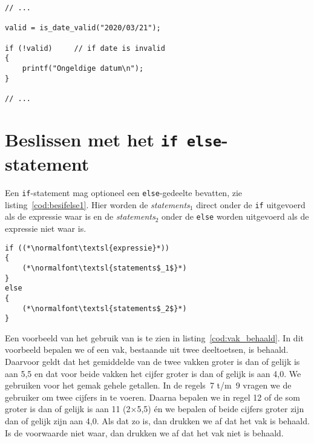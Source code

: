 \begin{lstlisting}[caption=Gebruik van de negatie-operator.,label=cod:besif2]
// ...

valid = is_date_valid("2020/03/21");

if (!valid)     // if date is invalid
{
    printf("Ongeldige datum\n");
}

// ...
\end{lstlisting}


\section{Beslissen met het \texttt{if else}-statement}
Een \texttt{if}-statement mag optioneel een \texttt{else}-gedeelte bevatten, zie listing~\ref{cod:besifelse1}. Hier worden de \textsl{statements}$_1$ direct onder de \texttt{if} uitgevoerd als de expressie waar is en de \textsl{statements}$_2$ onder de \texttt{else} worden uitgevoerd als de expressie niet waar is.

\begin{lstlisting}[caption=Algemene opzet van het \texttt{if else}-statement.,label=cod:besifelse1]
if ((*\normalfont\textsl{expressie}*))
{
    (*\normalfont\textsl{statements$_1$}*)
}
else
{
    (*\normalfont\textsl{statements$_2$}*)
}
\end{lstlisting}



Een voorbeeld van het gebruik van  is te zien in listing~\ref{cod:vak_behaald}. In dit voorbeeld bepalen we of een vak, bestaande uit twee deeltoetsen, is behaald. Daarvoor geldt dat het gemiddelde van de twee vakken groter is dan of gelijk is aan 5,5 en dat voor beide vakken het cijfer groter is dan of gelijk is aan 4,0. We gebruiken voor het gemak gehele getallen. In de regels~7 t/m~9 vragen we de gebruiker om twee cijfers in te voeren. Daarna bepalen we in regel 12 of de som groter is dan of gelijk is aan 11 (2$\times$5,5) én we bepalen of beide cijfers groter zijn dan of gelijk zijn aan 4,0. Als dat zo is, dan drukken we af dat het vak is behaald. Is de voorwaarde niet waar, dan drukken we af dat het vak niet is behaald.

